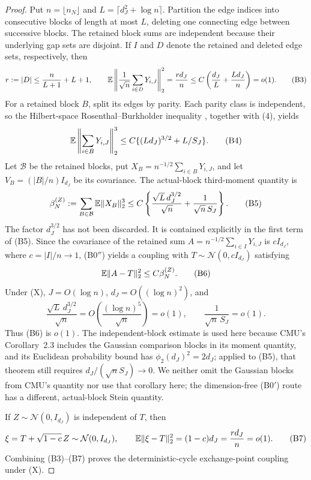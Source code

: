 \begin{proof}
Put $n=\lfloor n_N\rfloor$ and
$L=\lceil d_J^2+\log n\rceil$.  Partition the edge indices into consecutive
blocks of length at most $L$, deleting one connecting edge between successive
blocks.  The retained block sums are independent because their underlying
gap sets are disjoint.  If $I$ and $D$ denote the retained and deleted edge
sets, respectively, then
\[
 r:=|D|\leq \frac{n}{L+1}+L+1,
 \qquad
 \mathbb E\left\|\frac1{\sqrt n}\sum_{i\in D}Y_{i,J}\right\|_2^2
 =\frac{rd_J}{n}
 \leq C\left(\frac{d_J}{L}+\frac{Ld_J}{n}\right)=o(1).
 \tag{B3}
\]
For a retained block $B$, split its edges by parity.  Each parity class is
independent, so the Hilbert-space Rosenthal--Burkholder inequality
\cite{Pinelis1994OptimalMartingaleBounds}, together with \textup{(4)}, yields
\[
 \mathbb E\left\|\sum_{i\in B}Y_{i,J}\right\|_2^3
 \leq C\{(Ld_J)^{3/2}+L/S_J\}.
 \tag{B4}
\]
Let $\mathcal B$ be the retained blocks, put
$X_B=n^{-1/2}\sum_{i\in B}Y_{i,J}$, and let
$V_B=(|B|/n)I_{d_J}$ be its covariance.  The actual-block third-moment
quantity is
\[
 \beta_N^{(Z)}
 :=\sum_{B\in\mathcal B}\mathbb E\|X_B\|_2^3
 \leq C\left\{
  \frac{\sqrt L\,d_J^{3/2}}{\sqrt n}
  +\frac1{\sqrt n\,S_J}
 \right\}.
 \tag{B5}
\]
The factor $d_J^{3/2}$ has not been discarded.  It is contained explicitly
in the first term of \textup{(B5)}.  Since the covariance of the retained sum
$A=n^{-1/2}\sum_{i\in I}Y_{i,J}$ is $cI_{d_J}$, where $c=|I|/n\to1$,
\textup{(B0$''$)} yields a coupling with
$T\sim\mathcal N(0,cI_{d_J})$ satisfying
\[
 \mathbb E\|A-T\|_2^2\leq C\beta_N^{(Z)}.
 \tag{B6}
\]
Under \textup{(X)}, $J=O(\log n)$, $d_J=O((\log n)^2)$, and
\[
 \frac{\sqrt L\,d_J^{3/2}}{\sqrt n}
 =O\!\left(\frac{(\log n)^5}{\sqrt n}\right)=o(1),
 \qquad
 \frac1{\sqrt n\,S_J}=o(1).
\]
Thus \textup{(B6)} is $o(1)$.  The independent-block estimate is used here
because CMU's Corollary~2.3 includes the Gaussian comparison blocks in its
moment quantity, and its
Euclidean probability bound has $\phi_2(d_J)^2=2d_J$; applied to
\textup{(B5)}, that theorem still requires
$d_J/(\sqrt nS_J)\to0$.  We neither omit the Gaussian blocks from CMU's
quantity nor use that corollary here; the dimension-free
\textup{(B0$'$)} route has a different, actual-block Stein quantity.

If $Z\sim\mathcal N(0,I_{d_J})$ is independent of $T$, then
\[
 \xi=T+\sqrt{1-c}\,Z\sim\mathcal N(0,I_{d_J}),
 \qquad
 \mathbb E\|\xi-T\|_2^2=(1-c)d_J=\frac{rd_J}{n}=o(1).
 \tag{B7}
\]
Combining \textup{(B3)}--\textup{(B7)} proves the deterministic-cycle
exchange-point coupling under \textup{(X)}.


\end{proof}
